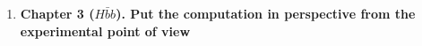 \documentclass[main.tex]{subfiles}
\begin{document}
\begin{enumerate}
    \item \textbf{Chapter 3 ($H\bar{b}b$). Put the computation in perspective from the experimental point of view} \\

\end{enumerate}
\end{document}
